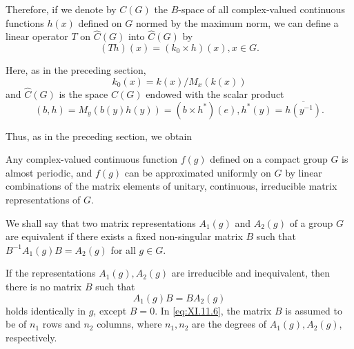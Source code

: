 Therefore, if we denote by $C(G)$ the $B$-space of all complex-valued continuous functions $h(x)$ defined on $G$ normed by the maximum norm, we can define a linear operator $T$ on $\hat{C}(G)$ into $\hat{C}(G)$ by 
\begin{equation}\label{eq:XI.11.3}
(T h) (x) = \left(k _{0} \times h\right) (x), x \in G.
\end{equation}

Here, as in the preceding section, 
\begin{equation}\label{eq:XI.11.4}
k _{0} (x) = k (x) / M _{x} (k (x))
\end{equation}
and $\hat{C}(G)$ is the space $C(G)$ endowed with the scalar product 
\begin{equation}\label{eq:XI.11.5}
(b, h) = M _{y} (b (y) h (y)) = (b \times h ^{*}) (e), h ^{*} (y) = \overline {{{h (y ^{-1})}}}.
\end{equation}

Thus, as in the preceding section, we obtain 

\begin{theorem}\label{thm:XI.11.Theorem.1} Any complex-valued continuous function $f(g)$ defined on a compact group $G$ is almost periodic, and $f(g)$ can be approximated uniformly on $G$ by linear combinations of the matrix elements of unitary, continuous, irreducible matrix representations of $G$. 
\end{theorem}

We shall say that two matrix representations $A_{1}(g)$ and $A_{2}(g)$ of a group $G$ are equivalent if there exists a fixed non-singular matrix $B$ such that $B^{-1}A_{1}(g)B = A_{2}(g)$ for all $g \in G$. 

\begin{proposition}\label{prop:XI.11.Proposition.2} If the representations $A_{1}(g), A_{2}(g)$ are irreducible and inequivalent, then there is no matrix $B$ such that 
\begin{equation}\label{eq:XI.11.6}
A _{1} (g) B = B A _{2} (g)
\end{equation}
holds identically in $g$, except $B = 0$. In \eqref{eq:XI.11.6}, the matrix $B$ is assumed to be of $n_1$ rows and $n_2$ columns, where $n_1, n_2$ are the degrees of $A_1(g), A_2(g)$, respectively. 
\end{proposition}

